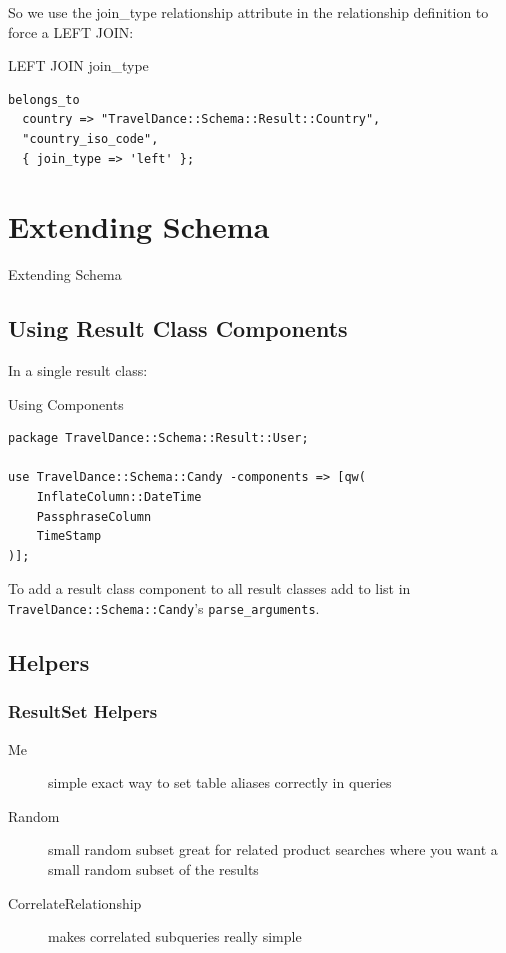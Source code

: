 So we use the join\_type relationship attribute in the relationship definition to force a LEFT JOIN:

\begin{frame}[fragile]{LEFT JOIN join\_type}
\begin{lstlisting}
belongs_to
  country => "TravelDance::Schema::Result::Country",
  "country_iso_code",
  { join_type => 'left' };
\end{lstlisting}
\end{frame}

\section{Extending Schema}
\begin{frame}{Extending Schema}
\end{frame}

\subsection{Using Result Class Components}

In a single result class:

\begin{frame}[fragile]{Using Components}
\begin{lstlisting}
package TravelDance::Schema::Result::User;

use TravelDance::Schema::Candy -components => [qw(
    InflateColumn::DateTime 
    PassphraseColumn
    TimeStamp
)];

\end{lstlisting}
\end{frame}

To add a result class component to all result classes add to list 
in \verb|TravelDance::Schema::Candy|'s \verb|parse_arguments|.

\subsection{Helpers}
\subsubsection{ResultSet Helpers}
\begin{description}
\item[Me] 
simple exact way to set table aliases correctly in queries
\item[Random] small random subset
great for related product searches where you want a small 
random subset of the results
\item[CorrelateRelationship] 
makes correlated subqueries really simple
\end{description}

